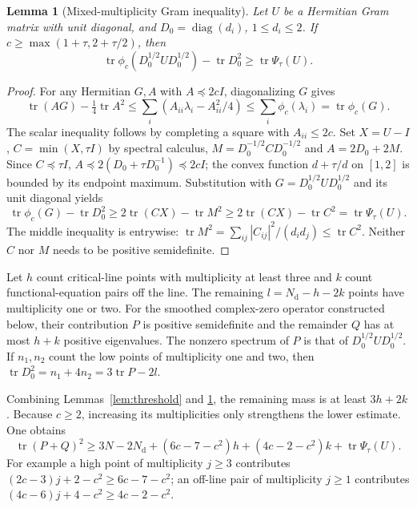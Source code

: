 \documentclass[11pt]{article}
\newcommand{\tr}{\operatorname{tr}}
\newcommand{\Nd}{N_{\mathrm d}}
\newtheorem{lemma}[theorem]{Lemma}
\theoremstyle{remark}\newtheorem{remark}[theorem]{Remark}
\begin{document}
\begin{lemma}[Mixed-multiplicity Gram inequality]\label{lem:mixed}
Let $U$ be a Hermitian Gram matrix with unit diagonal, and
$D_0=\operatorname{diag}(d_i)$, $1\le d_i\le2$. If
$c\ge\max(1+\tau,2+\tau/2)$, then
\[
 \tr\phi_c(D_0^{1/2}UD_0^{1/2})-\tr D_0^2
 \ge\tr\Psi_\tau(U).
\]
\end{lemma}
\begin{proof}
For any Hermitian $G,A$ with $A\preceq2cI$, diagonalizing $G$ gives
\[
 \tr(AG)-\tfrac14\tr A^2
 \le\sum_i(A_{ii}\lambda_i-A_{ii}^2/4)
 \le\sum_i\phi_c(\lambda_i)=\tr\phi_c(G).
\]
The scalar inequality follows by completing a square with $A_{ii}\le2c$.
Set $X=U-I$, $C=\min(X,\tau I)$ by spectral calculus,
$M=D_0^{-1/2}CD_0^{-1/2}$ and $A=2D_0+2M$.
Since $C\preceq\tau I$,
$A\preceq2(D_0+\tau D_0^{-1})\preceq2cI$; the convex function
$d+\tau/d$ on $[1,2]$ is bounded by its endpoint maximum.
Substitution with $G=D_0^{1/2}UD_0^{1/2}$ and its unit diagonal yields
\[
 \tr\phi_c(G)-\tr D_0^2
 \ge2\tr(CX)-\tr M^2
 \ge2\tr(CX)-\tr C^2=\tr\Psi_\tau(U).
\]
The middle inequality is entrywise:
$\tr M^2=\sum_{ij}|C_{ij}|^2/(d_i d_j)\le\tr C^2$.
Neither $C$ nor $M$ needs to be positive semidefinite.
\end{proof}

Let $h$ count critical-line points with multiplicity at least three and $k$
count functional-equation pairs off the line. The remaining
$l=\Nd-h-2k$ points have multiplicity one or two. For the smoothed
complex-zero operator constructed below, their contribution $P$ is positive
semidefinite and the remainder $Q$ has at most $h+k$ positive eigenvalues.
The nonzero spectrum of $P$ is that of $D_0^{1/2}UD_0^{1/2}$.
If $n_1,n_2$ count the low points of multiplicity one and two, then
$\tr D_0^2=n_1+4n_2=3\tr P-2l$.

Combining Lemmas~\ref{lem:threshold} and \ref{lem:mixed}, the remaining
mass is at least $3h+2k$. Because $c\ge2$, increasing its multiplicities
only strengthens the lower estimate. One obtains
\begin{equation}\label{eq:counts}
 \tr(P+Q)^2\ge3N-2\Nd+(6c-7-c^2)h+
 (4c-2-c^2)k+\tr\Psi_\tau(U).
\end{equation}
For example a high point of multiplicity $j\ge3$ contributes
$(2c-3)j+2-c^2\ge6c-7-c^2$; an off-line pair of multiplicity
$j\ge1$ contributes $(4c-6)j+4-c^2\ge4c-2-c^2$.
\end{document}
